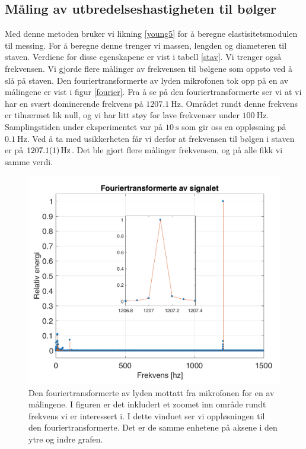 \documentclass[%
 reprint,
 amsmath,amssymb,
 aps,
 norsk,
 booktabs
]{revtex4-1}
\begin{document}
\subsection{Måling av utbredelseshastigheten til bølger}
Med denne metoden bruker vi likning \eqref{young5} for å beregne elastisitetsmodulen til messing. For å beregne denne trenger vi massen, lengden og diameteren til staven. Verdiene for disse egenskapene er vist i tabell \vref{stav}. Vi trenger også frekvensen. Vi gjorde flere målinger av frekvensen til bølgene som oppsto ved å slå på staven. Den fouriertransformerte av lyden mikrofonen tok opp på en av målingene er vist i figur \vref{fourier}. Fra å se på den fouriertransformerte ser vi at vi har en svært dominerende frekvens på $\SI{1207.1}{\hertz}$. Området rundt denne frekvens er tilnærmet lik null, og vi har litt støy for lave frekvenser under $\SI{100}{\hertz}$. Samplingstiden under eksperimentet var på $\SI{10}{\second}$ som gir oss en oppløsning på $\SI{0.1}{\hertz}$. Ved å ta med usikkerheten får vi derfor at frekvensen til bølgen i staven er på $\SI{1207.1\pm0.1}{\hertz}$. Det ble gjort flere målinger frekvensen, og på alle fikk vi samme verdi.
\begin{figure}[h!]
  \centering
  \includegraphics[scale=0.47]{fourier_c.pdf}
  \caption{Den fouriertransformerte av lyden mottatt fra mikrofonen for en av målingene. I figuren er det inkludert et zoomet inn område rundt frekvens vi er interessert i. I dette vinduet ser vi oppløsningen til den fouriertransformerte. Det er de samme enhetene på aksene i den ytre og indre grafen.}
  \label{fourier}
\end{figure}
\end{document}
